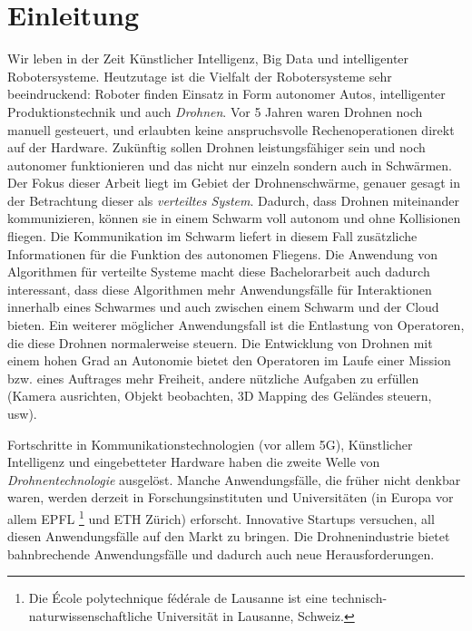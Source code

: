 \chapter{Einleitung}
\label{cha:Einleitung}

Wir leben in der Zeit Künstlicher Intelligenz, Big Data und intelligenter Robotersysteme. Heutzutage ist die Vielfalt der Robotersysteme sehr beeindruckend: Roboter finden Einsatz in Form autonomer Autos, intelligenter Produktionstechnik und auch \textit{Drohnen}. Vor 5 Jahren waren Drohnen noch manuell gesteuert, und erlaubten keine anspruchsvolle Rechenoperationen direkt auf der Hardware. Zukünftig sollen Drohnen leistungsfähiger sein und noch autonomer funktionieren und das nicht nur einzeln sondern auch in Schwärmen. Der Fokus dieser Arbeit liegt im Gebiet der Drohnenschwärme, genauer gesagt in der Betrachtung dieser als \textit{verteiltes System}. Dadurch, dass Drohnen miteinander kommunizieren, können sie in einem Schwarm voll autonom und ohne Kollisionen fliegen. Die Kommunikation im Schwarm liefert in diesem Fall zusätzliche Informationen für die Funktion des autonomen Fliegens. Die Anwendung von Algorithmen für verteilte Systeme macht diese Bachelorarbeit auch dadurch interessant, dass diese Algorithmen mehr Anwendungsfälle für Interaktionen innerhalb eines Schwarmes und auch zwischen einem Schwarm und der Cloud bieten. Ein weiterer möglicher Anwendungsfall ist die Entlastung von Operatoren, die diese Drohnen normalerweise steuern. Die Entwicklung von Drohnen mit einem hohen Grad an Autonomie bietet den Operatoren im Laufe einer Mission bzw. eines Auftrages mehr Freiheit, andere nützliche Aufgaben zu erfüllen (Kamera ausrichten, Objekt beobachten, 3D Mapping des Geländes steuern, usw).

Fortschritte in Kommunikationstechnologien (vor allem 5G), Künstlicher Intelligenz und eingebetteter Hardware haben die zweite Welle von \textit{Drohnentechnologie} ausgelöst. Manche Anwendungsfälle, die früher nicht denkbar waren, werden derzeit in Forschungsinstituten und Universitäten (in Europa vor allem EPFL  \footnote{Die École polytechnique fédérale de Lausanne ist eine technisch-naturwissenschaftliche Universität in Lausanne, Schweiz.} und ETH Zürich) erforscht. Innovative Startups versuchen, all diesen Anwendungsfälle auf den Markt zu bringen. Die Drohnenindustrie bietet bahnbrechende Anwendungsfälle und dadurch auch neue Herausforderungen.


